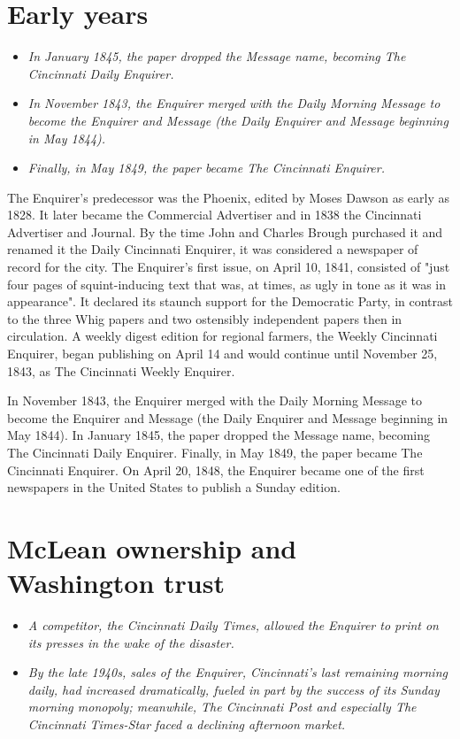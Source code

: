 \section{Early years}\label{early-years}

\begin{itemize}
\item
  \emph{In January 1845, the paper dropped the Message name, becoming
  The Cincinnati Daily Enquirer.}
\item
  \emph{In November 1843, the Enquirer merged with the Daily Morning
  Message to become the Enquirer and Message (the Daily Enquirer and
  Message beginning in May 1844).}
\item
  \emph{Finally, in May 1849, the paper became The Cincinnati Enquirer.}
\end{itemize}

The Enquirer's predecessor was the Phoenix, edited by Moses Dawson as
early as 1828. It later became the Commercial Advertiser and in 1838 the
Cincinnati Advertiser and Journal. By the time John and Charles Brough
purchased it and renamed it the Daily Cincinnati Enquirer, it was
considered a newspaper of record for the city. The Enquirer's first
issue, on April 10, 1841, consisted of "just four pages of
squint-inducing text that was, at times, as ugly in tone as it was in
appearance". It declared its staunch support for the Democratic Party,
in contrast to the three Whig papers and two ostensibly independent
papers then in circulation. A weekly digest edition for regional
farmers, the Weekly Cincinnati Enquirer, began publishing on April 14
and would continue until November 25, 1843, as The Cincinnati Weekly
Enquirer.

In November 1843, the Enquirer merged with the Daily Morning Message to
become the Enquirer and Message (the Daily Enquirer and Message
beginning in May 1844). In January 1845, the paper dropped the Message
name, becoming The Cincinnati Daily Enquirer. Finally, in May 1849, the
paper became The Cincinnati Enquirer. On April 20, 1848, the Enquirer
became one of the first newspapers in the United States to publish a
Sunday edition.

\section{McLean ownership and Washington
trust}\label{mclean-ownership-and-washington-trust}

\begin{itemize}
\item
  \emph{A competitor, the Cincinnati Daily Times, allowed the Enquirer
  to print on its presses in the wake of the disaster.}
\item
  \emph{By the late 1940s, sales of the Enquirer, Cincinnati's last
  remaining morning daily, had increased dramatically, fueled in part by
  the success of its Sunday morning monopoly; meanwhile, The Cincinnati
  Post and especially The Cincinnati Times-Star faced a declining
  afternoon market.}
\end{itemize}


